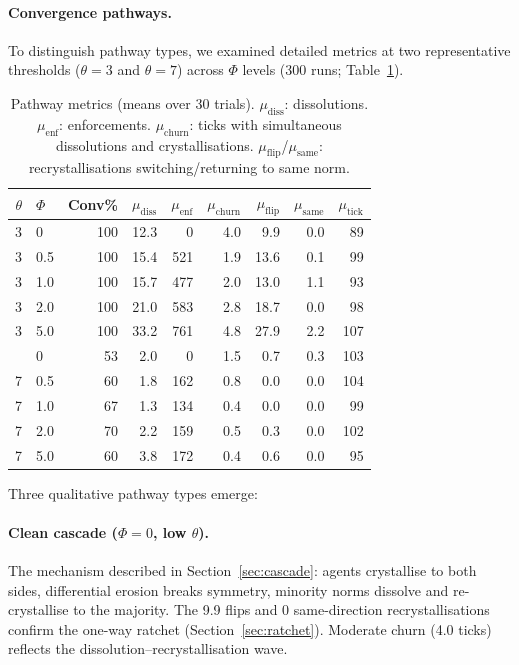 \documentclass[11pt,a4paper]{article}
\begin{document}
\paragraph{Convergence pathways.}
\label{sec:pathways}
To distinguish pathway types, we examined detailed metrics at two representative thresholds ($\theta = 3$ and $\theta = 7$) across $\Phi$ levels (300 runs; Table~\ref{tab:pathways}).

\begin{table}[H]
\centering
\caption{Pathway metrics (means over 30 trials). $\mu_{\mathrm{diss}}$: dissolutions. $\mu_{\mathrm{enf}}$: enforcements. $\mu_{\mathrm{churn}}$: ticks with simultaneous dissolutions and crystallisations. $\mu_{\mathrm{flip}}$/$\mu_{\mathrm{same}}$: recrystallisations switching/returning to same norm.}
\label{tab:pathways}
\small
\begin{tabular}{@{}rl rrrrrrr@{}}
\toprule
$\theta$ & $\Phi$ & Conv\% & $\mu_{\mathrm{diss}}$ & $\mu_{\mathrm{enf}}$ & $\mu_{\mathrm{churn}}$ & $\mu_{\mathrm{flip}}$ & $\mu_{\mathrm{same}}$ & $\mu_{\mathrm{tick}}$ \\
\midrule
3  & 0   & 100 & 12.3 & 0     & 4.0 & 9.9  & 0.0 & 89 \\
3  & 0.5 & 100 & 15.4 & 521   & 1.9 & 13.6 & 0.1 & 99 \\
3  & 1.0 & 100 & 15.7 & 477   & 2.0 & 13.0 & 1.1 & 93 \\
3  & 2.0 & 100 & 21.0 & 583   & 2.8 & 18.7 & 0.0 & 98 \\
3  & 5.0 & 100 & 33.2 & 761   & 4.8 & 27.9 & 2.2 & 107 \\
\addlinespace
7  & 0   & 53  & 2.0  & 0     & 1.5 & 0.7  & 0.3 & 103 \\
7  & 0.5 & 60  & 1.8  & 162   & 0.8 & 0.0  & 0.0 & 104 \\
7  & 1.0 & 67  & 1.3  & 134   & 0.4 & 0.0  & 0.0 & 99 \\
7  & 2.0 & 70  & 2.2  & 159   & 0.5 & 0.3  & 0.0 & 102 \\
7  & 5.0 & 60  & 3.8  & 172   & 0.4 & 0.6  & 0.0 & 95 \\
\bottomrule
\end{tabular}
\end{table}

Three qualitative pathway types emerge:

\paragraph{Clean cascade ($\Phi = 0$, low $\theta$).} The mechanism described in Section~\ref{sec:cascade}: agents crystallise to both sides, differential erosion breaks symmetry, minority norms dissolve and re-crystallise to the majority. The 9.9 flips and 0 same-direction recrystallisations confirm the one-way ratchet (Section~\ref{sec:ratchet}). Moderate churn (4.0 ticks) reflects the dissolution--recrystallisation wave.
\end{document}
